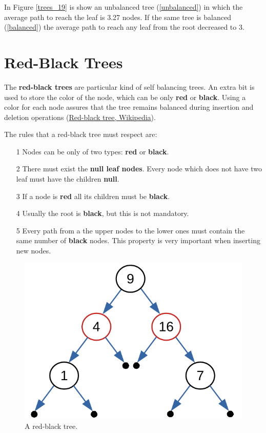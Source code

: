 In Figure \ref{trees_19} is show an unbalanced tree (\ref{unbalanced}) in which the average path to reach the leaf is 3.27 nodes. If the same tree is balanced (\ref{balanced}) the average path to reach any leaf from the root decreased to 3.

\section{Red-Black Trees}
The \textbf{red-black trees} are particular kind of self balancing trees. An extra bit is used to store the color of the node, which can be only \textbf{red} or \textbf{black}. Using a color for each node assures that the tree remains balanced during insertion and deletion operations \cite{wikiblackred} (\href{https://en.wikipedia.org/wiki/Red%E2%80%93black_tree}{Red-black tree, Wikipedia}).

The rules that a red-black tree must respect are:
\begin{itemize}
\item[1] Nodes can be only of two types: \textbf{red} or \textbf{black}.
\item[2] There must exist the \textbf{null leaf nodes}. Every node which does not have two leaf must have the children \textbf{null}.
\item[3] If a node is \textbf{red} all its children must be \textbf{black}.
\item[4] Usually the root is \textbf{black}, but this is not mandatory.
\item[5] Every path from a the upper nodes to the lower ones must contain the same number of \textbf{black} nodes. This property is very important when inserting new nodes.
\end{itemize}

\begin{figure}[H]
	\begin{center}
		\includegraphics[scale=.6]{chapters/trees/images/trees_20.pdf}
		\caption[A red-black tree.]{A red-black tree.}
		\label{trees_20}
	\end{center}
\end{figure}

